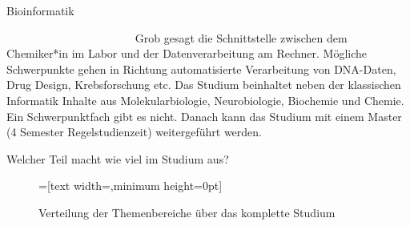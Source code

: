 
\begin{Huge}
    Bioinformatik
\end{Huge}

\begin{exampleblock}{\textcolor{white}{Was ist der Studiengang?}}
    Grob gesagt die Schnittstelle zwischen dem Chemiker*in im Labor und der Datenverarbeitung am Rechner. Mögliche Schwerpunkte gehen in Richtung automatisierte Verarbeitung von DNA-Daten, Drug Design, Krebsforschung etc.
    Das Studium beinhaltet neben der klassischen Informatik Inhalte aus Molekularbiologie, Neurobiologie, Biochemie und Chemie. Ein Schwerpunktfach gibt es nicht. Danach kann das Studium mit einem Master (4 Semester Regelstudienzeit) weitergeführt werden.
\end{exampleblock}

\begin{block}{Welcher Teil macht wie viel im Studium aus?}
    \begin{figure}[h!]
        \begin{minipage}{\linewidth}
            \centering
            =[text width={},minimum height=0pt]
        \end{minipage}
        \vspace{-20pt}
	\caption{Verteilung der Themenbereiche über das komplette Studium}
    \end{figure}
\end{block}

